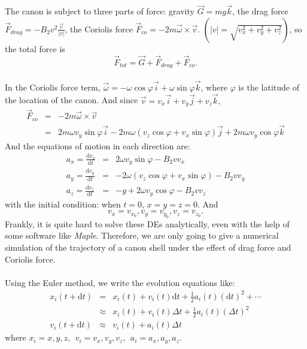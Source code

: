 \documentclass[a4paper]{article}
\begin{document}
	The canon is subject to three parts of force: gravity $\vec{G}=mg\vec{k}$, the drag force $\vec{F}_{drag}=-B_2v^2\frac{\vec{v}}{|v|}$, the Coriolis force $\vec{F}_{co}=-2m\vec{\omega}\times\vec{v}$. $\left(|v|=\sqrt{v_x^2+v_y^2+v_z^2}\right)$, so the total force is $$\vec{F}_{tot}=\vec{G}+\vec{F}_{drag}+\vec{F}_{co}.$$\\
In the Coriolis force term, $\vec{\omega}=-\omega\cos\varphi\vec{i}+\omega\sin\varphi\vec{k}$, where $\varphi$ is the latitude of the location of the canon. And since $\vec{v}=v_x\vec{i}+v_y\vec{j}+v_z\vec{k},$ 
\begin{eqnarray*}
	\vec{F}_{co}&=&-2m\vec{\omega}\times\vec{v}\\
	&=&2m\omega v_y\sin\varphi\vec{i}-2m\omega\left(v_z\cos\varphi+v_x\sin\varphi\right)\vec{j}+2m\omega v_y\cos\varphi\vec{k}
\end{eqnarray*}
And the equations of motion in each direction are:
\newcommand{\ud}{\mathrm{d}}
\begin{eqnarray}
	a_x=\frac{\ud v_x}{\ud t}&=&2\omega v_y\sin\varphi-B_2vv_x\\
	a_y=\frac{\ud v_y}{\ud t}&=&-2\omega\left(v_z\cos\varphi+v_x\sin\varphi\right)-B_2vv_y\\
	a_z=\frac{\ud v_z}{\ud t}&=&-g+2\omega v_y\cos\varphi-B_2vv_z
\end{eqnarray}
with the initial condition: when $t=0$, $x=y=z=0$. And $$v_x=v_{x_0},v_y=v_{y_0},v_z=v_{z_0}.$$
Frankly,  it is quite hard to solve these DEs analytically, even with the help of some software like \emph{Maple}. Therefore, we are only going to give a numerical simulation of the trajectory of a canon shell under the effect of drag force and Coriolis force.\\\\
Using the Euler method, we write the evolution equations like:
\begin{eqnarray*}
	x_i(t+\ud t)&=&x_i(t)+v_i(t)\ud t+\frac{1}{2}a_i(t)\left(\ud t\right)^2+\cdots\\
	&\approx& x_i(t)+v_i(t)\Delta t+\frac{1}{2}a_i(t)\left(\Delta t\right)^2\\
	v_i(t+\ud t)&\approx&v_i(t)+a_i(t)\Delta t
\end{eqnarray*}
where $x_i=x,y,z,\ \ v_i=v_x, v_y, v_z,\ \ a_i=a_x, a_y,a_z$.\\\\
\end{document}
